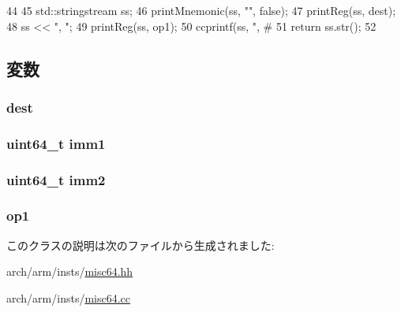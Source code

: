 \begin{DoxyCode}
44 {
45     std::stringstream ss;
46     printMnemonic(ss, "", false);
47     printReg(ss, dest);
48     ss << ", ";
49     printReg(ss, op1);
50     ccprintf(ss, ", #%
51     return ss.str();
52 }
\end{DoxyCode}


\subsection{変数}
\hypertarget{classRegRegImmImmOp64_aec72e8e45bdc87abeeeb75d2a8a9a716}{
\subsubsection[{dest}]{ {\bf dest}}}
\label{classRegRegImmImmOp64_aec72e8e45bdc87abeeeb75d2a8a9a716}
\hypertarget{classRegRegImmImmOp64_a846a1153344f66cc5d7c5af6fc071bb4}{
\subsubsection[{imm1}]{\setlength{\rightskip}{0pt plus 5cm}uint64\_\-t {\bf imm1}}}
\label{classRegRegImmImmOp64_a846a1153344f66cc5d7c5af6fc071bb4}
\hypertarget{classRegRegImmImmOp64_a4b3bca3d7461f9d143e9bcd456390a27}{
\subsubsection[{imm2}]{\setlength{\rightskip}{0pt plus 5cm}uint64\_\-t {\bf imm2}}}
\label{classRegRegImmImmOp64_a4b3bca3d7461f9d143e9bcd456390a27}
\hypertarget{classRegRegImmImmOp64_a4c465c43ad568f8bcf8ae71480e9cfea}{
\subsubsection[{op1}]{ {\bf op1}}}
\label{classRegRegImmImmOp64_a4c465c43ad568f8bcf8ae71480e9cfea}


このクラスの説明は次のファイルから生成されました:\begin{DoxyCompactItemize}
\item 
arch/arm/insts/\hyperlink{misc64_8hh}{misc64.hh}\item 
arch/arm/insts/\hyperlink{misc64_8cc}{misc64.cc}\end{DoxyCompactItemize}
